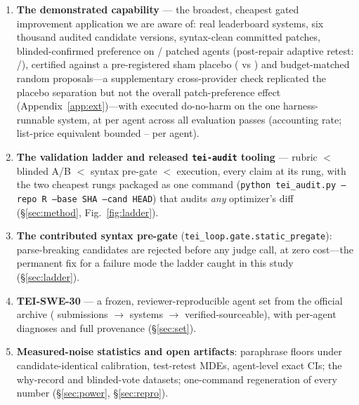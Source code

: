 \documentclass[11pt]{article}
\begin{document}
\begin{enumerate}\itemsep1pt
  \item \textbf{The demonstrated capability} --- the broadest, cheapest gated
  improvement application we are aware of: \swN{} real leaderboard systems,
  six thousand audited candidate versions, \swApplied{} syntax-clean committed
  patches, blinded-confirmed preference on \swBlindPreMajP/\swBlindAgents{}
  patched agents (post-repair adaptive retest: \swBlindMajP/\swBlindAgents),
  certified against a pre-registered sham placebo (\swShamShare{} vs
  \swBlindShare) and budget-matched random proposals---a supplementary
  cross-provider check replicated the placebo separation but not the overall
  patch-preference effect (Appendix~\ref{app:ext})---with executed do-no-harm
  on the one harness-runnable system, at
  \swCostPerAgent{} per agent across all evaluation passes (accounting rate; list-price equivalent
  bounded \swCostPerAgentListLo--\swCostPerAgentListHi{} per agent).
  \item \textbf{The validation ladder and released \texttt{tei-audit} tooling}
  --- rubric $<$ blinded A/B $<$ syntax pre-gate $<$ execution, every claim at
  its rung, with the two cheapest rungs packaged as one command
  (\texttt{python tei\_audit.py --repo R --base SHA --cand HEAD}) that audits
  \emph{any} optimizer's diff (\S\ref{sec:method}, Fig.~\ref{fig:ladder}).
  \item \textbf{The contributed syntax pre-gate}
  (\texttt{tei\_loop.gate.static\_pregate}): parse-breaking candidates are
  rejected before any judge call, at zero cost---the permanent fix for a failure
  mode the ladder caught in this study (\S\ref{sec:ladder}).
  \item \textbf{TEI-SWE-30} --- a frozen, reviewer-reproducible agent set from
  the official archive (\swSubs{} submissions $\to$ \swUnique{} systems $\to$
  \swN{} verified-sourceable), with per-agent diagnoses and full provenance
  (\S\ref{sec:set}).
  \item \textbf{Measured-noise statistics and open artifacts}: paraphrase
  floors under candidate-identical calibration, test-retest MDEs, agent-level
  exact CIs; the why-record and blinded-vote datasets; one-command regeneration
  of every number (\S\ref{sec:power}, \S\ref{sec:repro}).
\end{enumerate}
\end{document}
